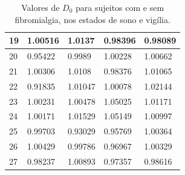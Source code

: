 \documentclass{ufscThesis}
\begin{document}
\begin{table}[h]
\begin{tabular}{|l|l|l|l|l|}
19        & 1.00516         & 1.0137          & 0.98396        & 0.98089       \\ \hline
20        & 0.95422         & 0.9989          & 1.00228        & 1.00662       \\ \hline
21        & 1.00306         & 1.0108          & 0.98376        & 1.01065       \\ \hline
22        & 0.91835         & 1.01047         & 1.00078        & 1.02144       \\ \hline
23        & 1.00231         & 1.00478         & 1.05025        & 1.01171       \\ \hline
24        & 1.00171         & 1.01529         & 1.05149        & 1.00997       \\ \hline
25        & 0.99703         & 0.93029         & 0.95769        & 1.00364       \\ \hline
26        & 1.00429         & 0.99786         & 0.96967        & 1.00329       \\ \hline
27        & 0.98237         & 1.00893         & 0.97357        & 0.98616       \\ \hline
\end{tabular}
\caption{Valores de $D_{0}$ para sujeitos com e sem fibromialgia, nos estados de sono e vigília.}
\label{tab_dzero}
\end{table}
\end{document}
